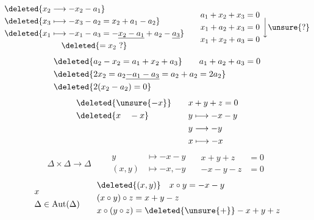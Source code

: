\[
\begin{aligned}
 &\deleted{x_2\longrightarrow-x_2-a_1}\\
 &\deleted{x_3\longmapsto-x_3-a_2=x_2+a_1-a_2}\\
 &\deleted{x_1\longmapsto-x_1-a_3=-\underline{x_2-a_1}+a_2-\underline{a_3}}\\
 &\hspace{7em}\deleted{=x_2\ ?}
\end{aligned}\qquad
\begin{aligned}
 a_1+x_2+x_3&=0\\
 x_1+a_2+x_3&=0\\
 x_1+x_2+a_3&=0
\end{aligned}\ \bigg\downarrow\unsure{?}
\]
\[
\begin{aligned}
 &\deleted{a_2-x_2=a_1+x_2+a_3}\qquad a_1+a_2+a_3=0\\
 &\deleted{2x_2=a_2\underline{-a_1-a_3}=a_2+a_2=2a_2}\\
 &\deleted{2(x_2-a_2)=0}
\end{aligned}
\]
\[
\begin{aligned}
 &\deleted{\unsure{-x}}\quad &&x+y+z=0\\
 &\deleted{x\quad -x}&&y\longmapsto-x-y\\
 &&&y\longrightarrow-y\\
 &&&x\longmapsto-x
\end{aligned}
\]
\[
 \Delta\times \Delta\longrightarrow \Delta\qquad
 \begin{aligned}
 y&\longmapsto-x-y\\
 (x,y)&\longmapsto-x,-y
 \end{aligned}\quad
 \begin{aligned}
 x+y+z&=0\\
 -x-y-z&=0
 \end{aligned}
\]
\[
\begin{aligned}
 &x\\
 &\Delta\in\operatorname{Aut}(\Delta)
\end{aligned}\qquad
\begin{aligned}
 &\deleted{(x,y)}\quad x\circ y=-x-y\\
 &(x\circ y)\circ z=x+y-z\\
 &x\circ(y\circ z)=\deleted{\unsure{+}}-x+y+z
\end{aligned}
\]

